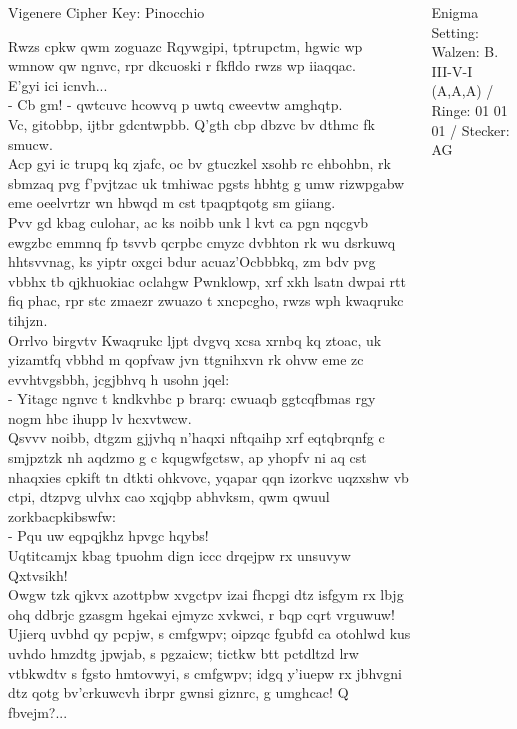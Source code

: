 \documentclass[final,hyperref={pdfpagelabels=false}]{beamer}
\begin{document}
\begin{frame}{}
\begin{columns}[t]
\begin{column}{.2\linewidth}
      \begin{block}{Vigenere Cipher}
\alert{Key: Pinocchio}\par
Rwzs cpkw qwm zoguazc Rqywgipi, tptrupctm, hgwic wp wmnow qw ngnvc, rpr dkcuoski r fkfldo rwzs wp iiaqqac.\\
E'gyi ici icnvh...\\
- Cb gm! - qwtcuvc hcowvq p uwtq cweevtw amghqtp.\\
Vc, gitobbp, ijtbr gdcntwpbb. Q'gth cbp dbzvc bv dthmc fk smucw.\\
Acp gyi ic trupq kq zjafc, oc bv gtuczkel xsohb rc ehbohbn, rk sbmzaq pvg f'pvjtzac uk tmhiwac pgsts hbhtg g umw rizwpgabw eme oeelvrtzr wn hbwqd m cst tpaqptqotg sm giiang.\\
Pvv gd kbag culohar, ac ks noibb unk l kvt ca pgn nqcgvb ewgzbc emmnq fp tsvvb qcrpbc cmyzc dvbhton rk wu dsrkuwq hhtsvvnag, ks yiptr oxgci bdur acuaz'Ocbbbkq, zm bdv pvg vbbhx tb qjkhuokiac oclahgw Pwnklowp, xrf xkh lsatn dwpai rtt fiq phac, rpr stc zmaezr zwuazo t xncpcgho, rwzs wph kwaqrukc tihjzn.\\
Orrlvo birgvtv Kwaqrukc ljpt dvgvq xcsa xrnbq kq ztoac, uk yizamtfq vbbhd m qopfvaw jvn ttgnihxvn rk ohvw eme zc evvhtvgsbbh, jcgjbhvq h usohn jqel:\\
- Yitagc ngnvc t kndkvhbc p brarq: cwuaqb ggtcqfbmas rgy nogm hbc ihupp lv hcxvtwcw.\\
Qsvvv noibb, dtgzm gjjvhq n'haqxi nftqaihp xrf eqtqbrqnfg c smjpztzk nh aqdzmo g c kqugwfgctsw, ap yhopfv ni aq cst nhaqxies cpkift tn dtkti ohkvovc, yqapar qqn izorkvc uqzxshw vb ctpi, dtzpvg ulvhx cao xqjqbp abhvksm, qwm qwuul zorkbacpkibswfw:\\
- Pqu uw eqpqjkhz hpvgc hqybs!\\
Uqtitcamjx kbag tpuohm dign iccc drqejpw rx unsuvyw Qxtvsikh!\\
Owgw tzk qjkvx azottpbw xvgctpv izai fhcpgi dtz isfgym rx lbjg ohq ddbrjc gzasgm hgekai ejmyzc xvkwci, r bqp cqrt vrguwuw! Ujierq uvbhd qy pcpjw, s cmfgwpv; oipzqc fgubfd ca otohlwd kus uvhdo hmzdtg jpwjab, s pgzaicw; tictkw btt pctdltzd lrw vtbkwdtv s fgsto hmtovwyi, s cmfgwpv; idgq y'iuepw rx jbhvgni dtz qotg bv'crkuwcvh ibrpr gwnsi giznrc, g umghcac! Q fbvejm?...\\
      \end{block}
    \end{column}
    \begin{column}{.2\linewidth}
      \begin{block}{Enigma}
        \alert{Setting: Walzen: B. III-V-I (A,A,A) / Ringe: 01 01 01 / Stecker: AG}\par

\end{block}
\end{column}
\end{columns}
\end{frame}
\end{document}
